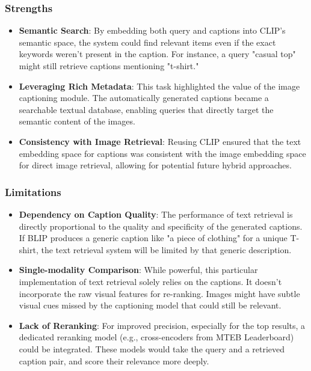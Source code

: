 \documentclass{article}
\begin{document}
\subsubsection{Strengths}
\begin{itemize}
    \item \textbf{Semantic Search}: By embedding both query and captions into CLIP's semantic space, the system could find relevant items even if the exact keywords weren't present in the caption. For instance, a query "casual top" might still retrieve captions mentioning "t-shirt."
    \item \textbf{Leveraging Rich Metadata}: This task highlighted the value of the image captioning module. The automatically generated captions became a searchable textual database, enabling queries that directly target the semantic content of the images.
    \item \textbf{Consistency with Image Retrieval}: Reusing CLIP ensured that the text embedding space for captions was consistent with the image embedding space for direct image retrieval, allowing for potential future hybrid approaches.
\end{itemize}

\subsubsection{Limitations}
\begin{itemize}
    \item \textbf{Dependency on Caption Quality}: The performance of text retrieval is directly proportional to the quality and specificity of the generated captions. If BLIP produces a generic caption like "a piece of clothing" for a unique T-shirt, the text retrieval system will be limited by that generic description.
    \item \textbf{Single-modality Comparison}: While powerful, this particular implementation of text retrieval solely relies on the captions. It doesn't incorporate the raw visual features for re-ranking. Images might have subtle visual cues missed by the captioning model that could still be relevant.
    \item \textbf{Lack of Reranking}: For improved precision, especially for the top results, a dedicated reranking model (e.g., cross-encoders from MTEB Leaderboard) could be integrated. These models would take the query and a retrieved caption pair, and score their relevance more deeply.
\end{itemize}
\end{document}
